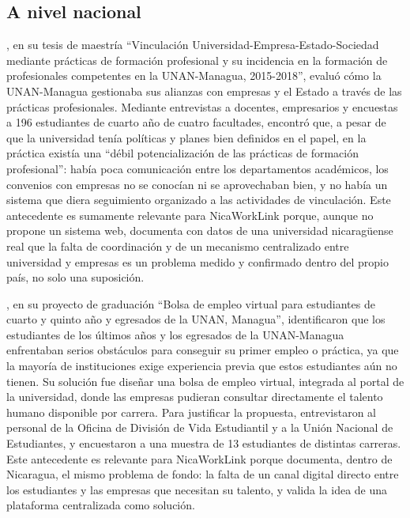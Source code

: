 \subsection{A nivel nacional}

\textcite{aleman2020}, en su tesis de maestría ``Vinculación Universidad-Empresa-Estado-Sociedad mediante prácticas de formación profesional y su incidencia en la formación de profesionales competentes en la UNAN-Managua, 2015-2018'', evaluó cómo la UNAN-Managua gestionaba sus alianzas con empresas y el Estado a través de las prácticas profesionales. Mediante entrevistas a docentes, empresarios y encuestas a 196 estudiantes de cuarto año de cuatro facultades, encontró que, a pesar de que la universidad tenía políticas y planes bien definidos en el papel, en la práctica existía una ``débil potencialización de las prácticas de formación profesional'': había poca comunicación entre los departamentos académicos, los convenios con empresas no se conocían ni se aprovechaban bien, y no había un sistema que diera seguimiento organizado a las actividades de vinculación. Este antecedente es sumamente relevante para NicaWorkLink porque, aunque no propone un sistema web, documenta con datos de una universidad nicaragüense real que la falta de coordinación y de un mecanismo centralizado entre universidad y empresas es un problema medido y confirmado dentro del propio país, no solo una suposición.

\textcite{iglesiasgaray2017}, en su proyecto de graduación ``Bolsa de empleo virtual para estudiantes de cuarto y quinto año y egresados de la UNAN, Managua'', identificaron que los estudiantes de los últimos años y los egresados de la UNAN-Managua enfrentaban serios obstáculos para conseguir su primer empleo o práctica, ya que la mayoría de instituciones exige experiencia previa que estos estudiantes aún no tienen. Su solución fue diseñar una bolsa de empleo virtual, integrada al portal de la universidad, donde las empresas pudieran consultar directamente el talento humano disponible por carrera. Para justificar la propuesta, entrevistaron al personal de la Oficina de División de Vida Estudiantil y a la Unión Nacional de Estudiantes, y encuestaron a una muestra de 13 estudiantes de distintas carreras. Este antecedente es relevante para NicaWorkLink porque documenta, dentro de Nicaragua, el mismo problema de fondo: la falta de un canal digital directo entre los estudiantes y las empresas que necesitan su talento, y valida la idea de una plataforma centralizada como solución.

